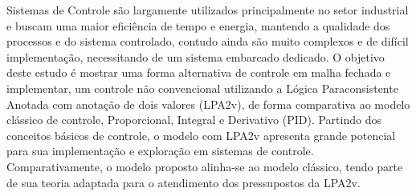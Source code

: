 





Sistemas de Controle são largamente utilizados principalmente no setor industrial e buscam uma maior eficiência de tempo e energia, mantendo a qualidade dos processos e do sistema controlado, 
contudo ainda são muito complexos e de difícil implementação, necessitando de um sistema embarcado dedicado.
O objetivo deste estudo é mostrar uma forma alternativa de controle em malha fechada e implementar, um controle não convencional utilizando a Lógica Paraconsistente Anotada com anotação de dois valores (LPA2v), 
de forma comparativa ao modelo clássico de controle, Proporcional, Integral e Derivativo (PID).
Partindo dos conceitos básicos de controle, o modelo com LPA2v apresenta grande potencial para sua implementação e exploração em sistemas de controle.
Comparativamente, o modelo proposto alinha-se ao modelo clássico, tendo parte de sua teoria adaptada para o atendimento dos pressupostos da LPA2v.
		

